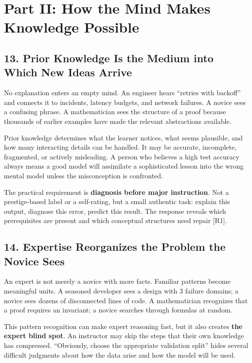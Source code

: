 \section*{Part II: How the Mind Makes Knowledge Possible}

\subsection*{13. Prior Knowledge Is the Medium into Which New Ideas Arrive}

No explanation enters an empty mind. An engineer hears ``retries with backoff'' and connects it to incidents, latency budgets, and network failures. A novice sees a confusing phrase. A mathematician sees the structure of a proof because thousands of earlier examples have made the relevant abstractions available.

Prior knowledge determines what the learner notices, what seems plausible, and how many interacting details can be handled. It may be accurate, incomplete, fragmented, or actively misleading. A person who believes a high test accuracy always means a good model will assimilate a sophisticated lesson into the wrong mental model unless the misconception is confronted.

The practical requirement is \textbf{diagnosis before major instruction}. Not a prestige-based label or a self-rating, but a small authentic task: explain this output, diagnose this error, predict this result. The response reveals which prerequisites are present and which conceptual structures need repair [R1].

\subsection*{14. Expertise Reorganizes the Problem the Novice Sees}

An expert is not merely a novice with more facts. Familiar patterns become meaningful units. A seasoned developer sees a design with 3 failure domains; a novice sees dozens of disconnected lines of code. A mathematician recognizes that a proof requires an invariant; a novice searches through formulas at random.

This pattern recognition can make expert reasoning fast, but it also creates \textbf{the expert blind spot}. An instructor may skip the steps that their own knowledge has compressed. ``Obviously, choose the appropriate validation split'' hides several difficult judgments about how the data arise and how the model will be used.

